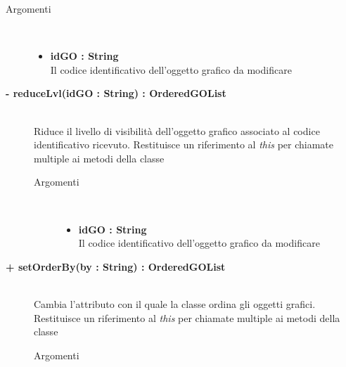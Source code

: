 \begin{description}
\begin{description}
		\begin{description}
			\item[Argomenti] \hfill \\
				\begin{itemize}
				
					\item \textbf{idGO : String			} \hfill \\
					Il codice identificativo dell'oggetto grafico da modificare
					
				\end{itemize}
		\end{description}
	\end{description}
	
	\begin{description}
		\item[\textbf{\color{blue}- reduceLvl(idGO : String) : OrderedGOList			}] \hfill \\
			Riduce il livello di visibilità dell'oggetto grafico associato al codice identificativo ricevuto. Restituisce un riferimento al \textit{this} per chiamate multiple ai metodi della classe
			
		\begin{description}
			\item[Argomenti] \hfill \\
				\begin{itemize}
				
					\item \textbf{idGO : String			} \hfill \\
					Il codice identificativo dell'oggetto grafico da modificare
					
				\end{itemize}
		\end{description}
	\end{description}
	
	\begin{description}
		\item[\textbf{\color{blue}+ setOrderBy(by : String) : OrderedGOList			}] \hfill \\
			Cambia l'attributo con il quale la classe ordina gli oggetti grafici. Restituisce un riferimento al \textit{this} per chiamate multiple ai metodi della classe
			
		\begin{description}
			\item[Argomenti] \hfill \\
				\begin{itemize}
				

\end{itemize}
\end{description}
\end{description}
\end{description}
